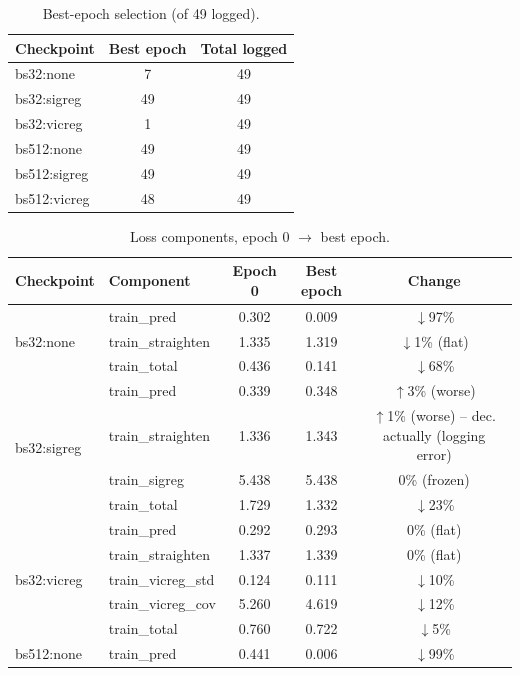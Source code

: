 \begin{table}[H]
\centering
\caption{Best-epoch selection (of 49 logged).}
\label{tab:bs-reg-clsmlp-bestepoch}
\begin{tabular}{lcc}
\toprule
Checkpoint & Best epoch & Total logged \\
\midrule
bs32:none & 7 & 49 \\
bs32:sigreg & 49 & 49 \\
bs32:vicreg & 1 & 49 \\
bs512:none & 49 & 49 \\
bs512:sigreg & 49 & 49 \\
bs512:vicreg & 48 & 49 \\
\bottomrule
\end{tabular}
\end{table}

\begin{table}[H]
\centering
\caption{Loss components, epoch 0 $\to$ best epoch.}
\label{tab:bs-reg-clsmlp-losses}
\footnotesize
\begin{tabular}{llccc}
\toprule
Checkpoint & Component & Epoch 0 & Best epoch & Change \\
\midrule
\multirow{3}{*}{bs32:none}
 & train\_pred & 0.302 & 0.009 & $\downarrow$97\% \\
 & train\_straighten & 1.335 & 1.319 & $\downarrow$1\% (flat) \\
 & train\_total & 0.436 & 0.141 & $\downarrow$68\% \\
\midrule
\multirow{4}{*}{bs32:sigreg}
 & train\_pred & 0.339 & 0.348 & $\uparrow$3\% (worse) \\
 & train\_straighten & 1.336 & 1.343 & $\uparrow$1\% (worse) -- dec. actually (logging error)\\
 & train\_sigreg & 5.438 & 5.438 & 0\% (frozen) \\
 & train\_total & 1.729 & 1.332 & $\downarrow$23\% \\
\midrule
\multirow{5}{*}{bs32:vicreg}
 & train\_pred & 0.292 & 0.293 & 0\% (flat) \\
 & train\_straighten & 1.337 & 1.339 & 0\% (flat) \\
 & train\_vicreg\_std & 0.124 & 0.111 & $\downarrow$10\% \\
 & train\_vicreg\_cov & 5.260 & 4.619 & $\downarrow$12\% \\
 & train\_total & 0.760 & 0.722 & $\downarrow$5\% \\
\midrule
\multirow{3}{*}{bs512:none}
 & train\_pred & 0.441 & 0.006 & $\downarrow$99\% \\

\end{tabular}
\end{table}
